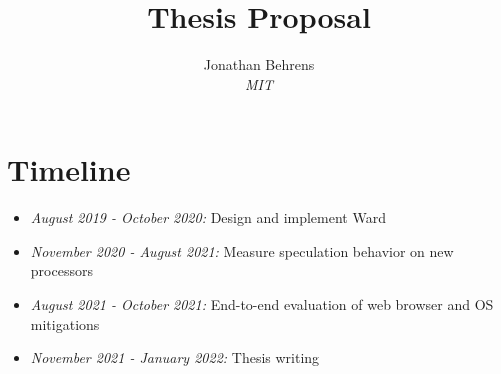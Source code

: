 \documentclass[letterpaper,12pt]{article}
\begin{document}
\date{\vspace{-\baselineskip}}

\title{\Large \bf
  Thesis Proposal
}

\author{ {\rm Jonathan Behrens} \\ \textit{MIT} }

\maketitle



\section*{Timeline}
\begin{itemize}
\item\textit{August 2019 - October 2020:} Design and implement Ward
\item\textit{November 2020 - August 2021:} Measure speculation behavior on new processors
\item\textit{August 2021 - October 2021:} End-to-end evaluation of web browser and OS mitigations
\item\textit{November 2021 - January 2022:} Thesis writing
\end{itemize}

{}

\end{document}
